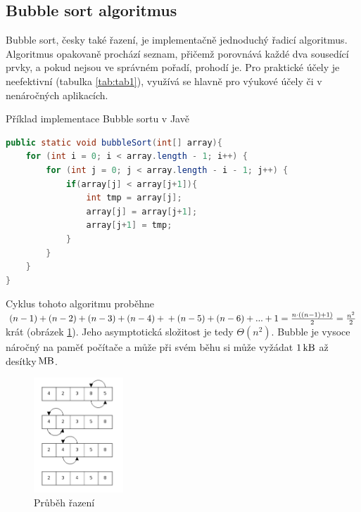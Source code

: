 \documentclass[a4paper,11pt]{article}
\begin{document}
	\subsection{Bubble sort algoritmus}
	Bubble sort, česky také  řazení, je implementačně jednoduchý řadicí algoritmus. Algoritmus opakovaně prochází seznam, přičemž porovnává každé dva sousedící prvky, a pokud nejsou ve správném pořadí, prohodí je. Pro praktické účely je neefektivní (tabulka \ref{tab:tab1}), využívá se hlavně pro výukové účely či v\,nenáročných aplikacích.
	
	\begin{algorithm}[H]
	\caption{Příklad implementace Bubble sortu v Javě}
	\begin{lstlisting}[language=java]
public static void bubbleSort(int[] array){
    for (int i = 0; i < array.length - 1; i++) {
        for (int j = 0; j < array.length - i - 1; j++) {
            if(array[j] < array[j+1]){
                int tmp = array[j];
                array[j] = array[j+1];
                array[j+1] = tmp;
            }
        }
    }
}
	\end{lstlisting}
	\end{algorithm}
	Cyklus tohoto algoritmu proběhne $(n-1) + (n-2) + (n-3) + (n-4) + \\ + (n-5) + (n-6) + ... + 1 = \frac{n \cdot ((n-1) + 1)}{2} = \frac{n^2}{2}$ krát (obrázek \ref{fig:img2}). Jeho asymptotická složitost je tedy $\Theta (n^2)$.\cite{algoritmy} Bubble je vysoce náročný na paměť počítače a může při svém běhu si může vyžádat $1\,\textup{kB}$ až desítky$\,\textup{MB}$.\cite{book}
	
	\begin{figure}[H]
		\centering
    		\includegraphics[width=0.3\textwidth,natwidth=254,natheight=326]{ilustrace1.pdf}
		\caption{Průběh řazení \cite{img2}}
		\label{fig:img2}
	\end{figure}
	
	\newpage
	
\end{document}
